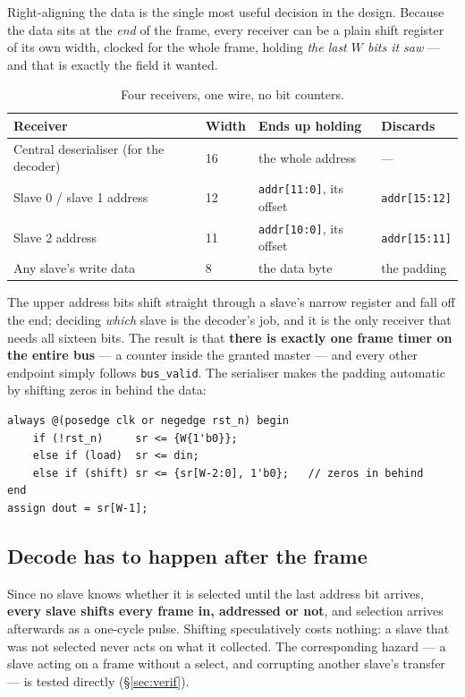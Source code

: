 \documentclass[11pt,a4paper]{article}
\newcommand{\sig}[1]{\texttt{#1}}
\begin{document}
Right-aligning the data is the single most useful decision in the design.
Because the data sits at the \emph{end} of the frame, every receiver can be a
plain shift register of its own width, clocked for the whole frame, holding
\emph{the last $W$ bits it saw} --- and that is exactly the field it wanted.

\begin{table}[htb]
\centering\small
\caption{Four receivers, one wire, no bit counters.}
\begin{tabular}{@{}llll@{}}
\toprule
\textbf{Receiver} & \textbf{Width} & \textbf{Ends up holding} & \textbf{Discards}\\
\midrule
Central deserialiser (for the decoder) & 16 & the whole address & ---\\
Slave 0 / slave 1 address & 12 & \sig{addr[11:0]}, its offset & \sig{addr[15:12]}\\
Slave 2 address           & 11 & \sig{addr[10:0]}, its offset & \sig{addr[15:11]}\\
Any slave's write data    & 8  & the data byte & the padding\\
\bottomrule
\end{tabular}
\end{table}

The upper address bits shift straight through a slave's narrow register and
fall off the end; deciding \emph{which} slave is the decoder's job, and it is
the only receiver that needs all sixteen bits. The result is that
\textbf{there is exactly one frame timer on the entire bus} --- a counter
inside the granted master --- and every other endpoint simply follows
\sig{bus\_valid}. The serialiser makes the padding automatic by shifting
zeros in behind the data:

\begin{lstlisting}
always @(posedge clk or negedge rst_n) begin
    if (!rst_n)     sr <= {W{1'b0}};
    else if (load)  sr <= din;
    else if (shift) sr <= {sr[W-2:0], 1'b0};   // zeros in behind
end
assign dout = sr[W-1];
\end{lstlisting}

\subsection{Decode has to happen after the frame}
\label{sec:decode}

Since no slave knows whether it is selected until the last address bit
arrives, \textbf{every slave shifts every frame in, addressed or not}, and
selection arrives afterwards as a one-cycle pulse. Shifting speculatively
costs nothing: a slave that was not selected never acts on what it collected.
The corresponding hazard --- a slave acting on a frame without a select, and
corrupting another slave's transfer --- is tested directly
(\S\ref{sec:verif}).
\end{document}
